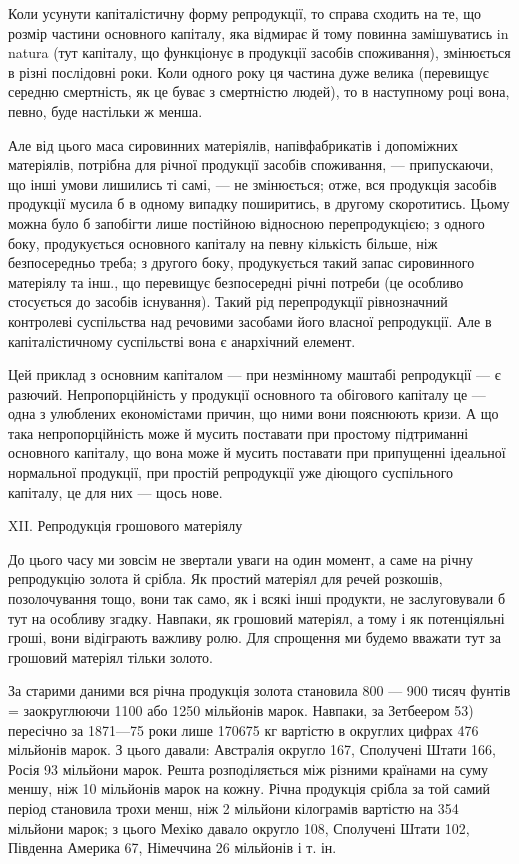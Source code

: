 Коли усунути капіталістичну форму репродукції, то справа сходить
на те, що розмір частини основного капіталу, яка відмирає й тому
повинна замішуватись in natura (тут капіталу, що функціонує в продукції
засобів споживання), змінюється в різні послідовні роки. Коли одного
року ця частина дуже велика (перевищує середню смертність, як це
буває з смертністю людей), то в наступному році вона, певно, буде
настільки ж менша.

Але від цього маса сировинних матеріялів, напівфабрикатів і допоміжних
матеріялів, потрібна для річної продукції засобів споживання, — припускаючи,
що інші умови лишились ті самі, — не змінюється; отже, вся
продукція засобів продукції мусила б в одному випадку поширитись, в
другому скоротитись. Цьому можна було б запобігти лише постійною
відносною перепродукцією; з одного боку, продукується основного
капіталу на певну кількість більше, ніж безпосередньо треба; з другого
боку, продукується такий запас сировинного матеріялу та інш., що
перевищує безпосередні річні потреби (це особливо стосується до засобів
існування). Такий рід перепродукції рівнозначний контролеві суспільства
над речовими засобами його власної репродукції. Але в капіталістичному
суспільстві вона є анархічний елемент.

Цей приклад з основним капіталом — при незмінному маштабі репродукції
— є разючий. Непропорційність у продукції основного та обігового
капіталу це — одна з улюблених економістами причин, що ними вони
пояснюють кризи. А що така непропорційність може й мусить поставати
при простому підтриманні основного капіталу, що вона може й
мусить поставати при припущенні ідеальної нормальної продукції, при
простій репродукції уже діющого суспільного капіталу, це для них — щось
нове.

XII. Репродукція грошового матеріялу

До цього часу ми зовсім не звертали уваги на один момент, а саме
на річну репродукцію золота й срібла. Як простий матеріял для речей
розкошів, позолочування тощо, вони так само, як і всякі інші продукти,
не заслуговували б тут на особливу згадку. Навпаки, як грошовий
матеріял, а тому і як потенціяльні гроші, вони відіграють важливу ролю.
Для спрощення ми будемо вважати тут за грошовий матеріял тільки золото.

За старими даними вся річна продукція золота становила 800 —
900 тисяч фунтів = заокруглюючи 1100 або 1250 мільйонів марок. Навпаки,
за Зетбеером 53) пересічно за 1871—75 роки лише 170675 кг вартістю
в округлих цифрах 476 мільйонів марок. З цього давали: Австралія
округло 167, Сполучені Штати 166, Росія 93 мільйони марок. Решта
розподіляється між різними країнами на суму меншу, ніж 10 мільйонів
марок на кожну. Річна продукція срібла за той самий період становила
трохи менш, ніж 2 мільйони кілограмів вартістю на 354 мільйони
марок; з цього Мехіко давало округло 108, Сполучені Штати 102,
Південна Америка 67, Німеччина 26 мільйонів і т. ін.

